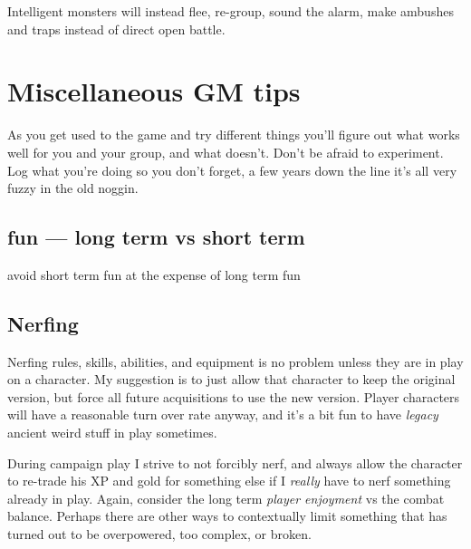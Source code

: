 Intelligent monsters will instead flee, re-group, sound the alarm, make ambushes and traps instead of direct open battle.















\section*{Miscellaneous GM tips}

As you get used to the game and try different things you'll figure out what works well for you and your group, and what doesn't. Don't be afraid to experiment. Log what you're doing so you don't forget, a few years down the line it's all very fuzzy in the old noggin.


\subsection*{fun --- long term vs short term}
\todo avoid short term fun at the expense of long term fun


\subsection*{Nerfing}
Nerfing rules, skills, abilities, and equipment is no problem unless they are in play on a character. My suggestion is to just allow that character to keep the original version, but force all future acquisitions to use the new version. Player characters will have a reasonable turn over rate anyway, and it's a bit fun to have \emph{legacy} ancient weird stuff in play sometimes.

During campaign play I strive to not forcibly nerf, and always allow the character to re-trade his XP and gold for something else if I \emph{really} have to nerf something already in play. Again, consider the long term \emph{player enjoyment} vs the combat balance. Perhaps there are other ways to contextually limit something that has turned out to be overpowered, too complex, or broken.


